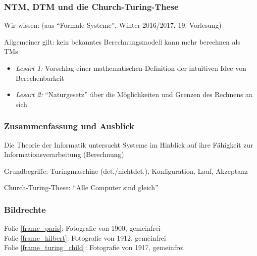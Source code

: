 \documentclass[onlymath]{beamer}
\begin{document}
\begin{frame}\frametitle{NTM, DTM und die Church-Turing-These}

Wir wissen: {\tiny(aus "`Formale Systeme"', Winter 2016/2017, 19. Vorlesung)}

\pause

Allgemeiner gilt: kein bekanntes Berechnungsmodell kann mehr berechnen als TMs


\begin{itemize}
\item \emph{Lesart 1:} Vorschlag einer mathematischen Definition der intuitiven Idee von Berechenbarkeit
\item \emph{Lesart 2:} "`Naturgesetz"' über die Möglichkeiten und Grenzen des Rechnens an sich
\end{itemize}

\end{frame}

\begin{frame}\frametitle{Zusammenfassung und Ausblick}

Die Theorie der Informatik untersucht Systeme im Hinblick auf ihre Fähigkeit zur Informationsverarbeitung (Berechnung)
\bigskip

Grundbegriffe: Turingmaschine (det./nichtdet.), Konfiguration, Lauf, Akzeptanz
\bigskip

Church-Turing-These: "`Alle Computer sind gleich"'
\bigskip


\end{frame}

\begin{frame}[t]\frametitle{Bildrechte}

Folie \ref{frame_paris}: Fotografie von 1900, gemeinfrei\\
Folie \ref{frame_hilbert}: Fotografie von 1912, gemeinfrei\\
Folie \ref{frame_turing_child}: Fotografie von 1917, gemeinfrei\\

\end{frame}
\end{document}
